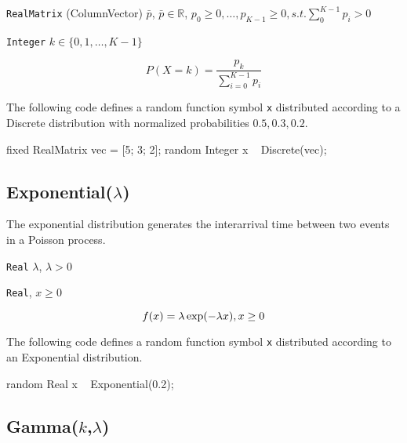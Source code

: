 \begin{itemize*}
\item[] \verb|RealMatrix| (ColumnVector) $\bar{p}$, $\bar{p} \in \mathbb{R}$, $p_{0} \geq 0, \ldots, p_{K-1} \geq 0, s.t. \sum_{0}^{K-1} p_{i} > 0$
\end{itemize*}

\begin{itemize*}
\item[] \verb|Integer| $k \in \{0, 1, \ldots, K-1 \}$ 
\end{itemize*}

\[
	P(X = k) = \frac{p_{k}}{\sum_{i=0}^{K -1} p_{i}}
\]

The following code defines a random function symbol \verb|x| distributed according to a Discrete distribution with normalized probabilities $0.5, 0.3, 0.2$.
\begin{blogcode}
fixed RealMatrix vec = [5; 3; 2];
random Integer x ~ Discrete(vec);
\end{blogcode}

\subsection{Exponential($\lambda$)} 
The exponential distribution generates the interarrival time between two events in a Poisson process.

\begin{itemize*}
\item[] \verb|Real|
 $\lambda$, $\lambda > 0$ 
\end{itemize*}
\begin{itemize*}
\item[] \verb|Real|, $x \geq 0$ 
\end{itemize*}

\[
	f(x) = \lambda \exp(-\lambda x) , x \geq 0 \\
\]

The following code defines a random function symbol \verb|x| distributed according to an Exponential distribution.
\begin{blogcode}
random Real x ~ Exponential(0.2);
\end{blogcode}

\subsection{Gamma($k$,$\lambda$)}

